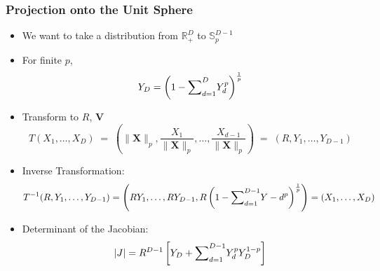 \documentclass[aspectratio=169,10pt,notes]{beamer}
\begin{document}

\begin{frame}
    \frametitle{Projection onto the Unit Sphere}
    {\footnotesize
    \begin{itemize}
        \item We want to take a distribution from 
            $\mathbb{R}_+^D$ to $\mathbb{S}_p^{D-1}$
        \item For finite $p$,
        \[
            Y_D = \left(1 - {\scriptsize \sum}_{d = 1}^D 
                Y_d^p \right)^{\frac{1}{p}}
        \]
        \item Transform to $R$, $\bm{V}$
        \[
            T(X_1,\ldots,X_D) \;=\; 
                \left(\lVert \bm{X}\rVert_p, \frac{X_1}{\lVert \bm{X}\rVert_p},
                    \ldots, \frac{X_{d-1}}{\lVert \bm{X}\rVert_p}\right) 
                \;=\; (R,Y_1,\ldots,Y_{D-1})
        \]
        \item Inverse Transformation:
        \[
            T^{-1}(R,Y_1,\ldots,Y_{D-1}) = 
                \left(RY_1,\ldots,RY_{D-1},
                    R\left(1 - {\scriptsize \sum}_{d = 1}^{D-1}Y-d^p
                        \right)^{\frac{1}{p}}\right) = (X_1,\ldots,X_D)
        \]
        \item Determinant of the Jacobian:
        \[
            \lvert J\rvert = R^{D-1}\left[Y_D + 
                {\scriptsize \sum}_{d = 1}^{D-1}Y_d^pY_D^{1-p}\right]
        \]
    \end{itemize}
    }
    
    \vfill
    \hyperlink{pgpareto:jacobian}{}
\end{frame} %
\end{document}
